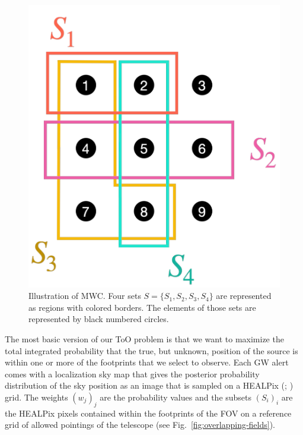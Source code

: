 \documentclass[twocolumn,times]{aastex631}
\begin{document}
\begin{figure}
    \centering
    \includegraphics[width=0.6\columnwidth]{figures/max-weighted-coverage}
    \caption{\label{fig:max-weighted-coverage}Illustration of \ac{MWC}. Four sets $S = \{S_1, S_2, S_3, S_4\}$ are represented as regions with colored borders. The elements of those sets are represented by black numbered circles.}
\end{figure}

The most basic version of our \ac{ToO} problem is that we want to maximize the total integrated probability that the true, but unknown, position of the source is within one or more of the footprints that we select to observe. Each \ac{GW} alert comes with a localization sky map that gives the posterior probability distribution of the sky position as an image that is sampled on a \acl{HEALPix} (; \citealt{2005ApJ...622..759G}) grid. The weights $(w_j)_j$ are the probability values and the subsets $(S_i)_i$ are the \ac{HEALPix} pixels contained within the footprints of the \ac{FOV} on a reference grid of allowed pointings of the telescope (see Fig.~\ref{fig:overlapping-fields}).
\end{document}

